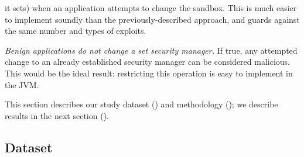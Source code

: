 \documentclass{sig-alternate}
\begin{document}
\begin{flushenum}
  it sets) when an application
  attempts to change the sandbox. This is much easier to implement soundly than
  the previously-described approach, and guards against the same number and types of
  exploits.
\item \textit{Benign applications do not change a set security manager.} If
  true, any attempted change to an already established security manager can be
  considered malicious. This would be the ideal result: restricting this
  operation is easy to implement in the JVM.
\end{flushenum}

This section describes our study dataset () and
methodology (); we describe results in the next section
(). 

\subsection{Dataset}\label{sec:Applications-Studied}
\end{document}
